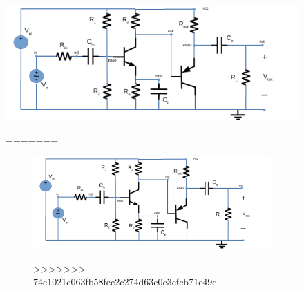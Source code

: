 \begin{figure} [!htb] 
  \includegraphics[width=\linewidth]{circuit.pdf}
  \caption{Amplifier circuit}
  \label{fig:theoplots}
  \endminipage\hfill
=======
\FloatBarrier
\begin{figure}
  \includegraphics[scale=0.7]{circuit.pdf}
  \caption{}
  \label{}
>>>>>>> 74e1021c063fb58fec2c274d63c0c3cfcb71e49c
\end{figure}




\end{figure}
